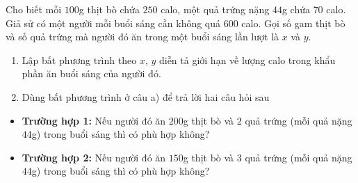 \begin{bt}%
	Cho biết mỗi $100$g thịt bò chứa $250$ calo, một quả trứng nặng $44$g chứa $70$ calo.  Giả sử có một người mỗi buổi sáng cần không quá $600$ calo. Gọi số gam thịt bò và số quả trứng mà người đó ăn trong một buổi sáng lần lượt là $x$ và $y$.
	\begin{enumerate}
		\item  Lập bất phương trình theo $x$, $y$ diễn tả giới hạn về lượng calo trong khẩu phần ăn buổi sáng của người đó.
		\item Dùng bất phương trình ở câu a) để trả lời  hai câu hỏi sau
	\end{enumerate}
	\begin{itemize}
		\item \textbf{Trường hợp 1:}  Nếu người đó ăn $200$g thịt bò và $2$ quả trứng (mỗi quả nặng $44$g) trong buổi sáng thì có phù hợp không?
		\item\textbf{ Trường hợp 2:} Nếu người đó ăn $150$g thịt bò và $3$ quả trứng (mỗi quả nặng $44$g) trong  buổi sáng thì có phù hợp không?
	\end{itemize}
\end{bt}

